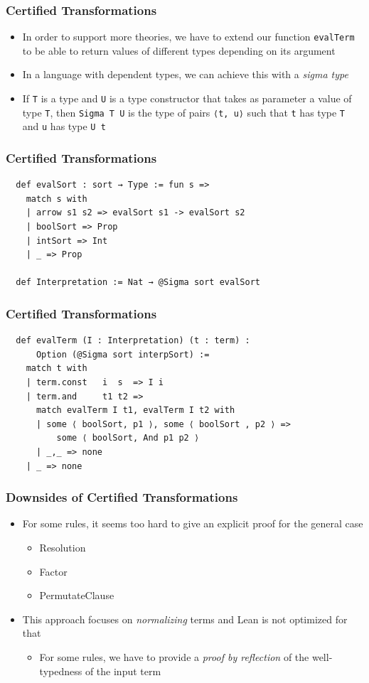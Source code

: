 \documentclass[usepdftitle=false,aspectratio=169,usenames,dvipsnames]{beamer}
\newcommand\vitem{\vfill\item}
\begin{document}
\begin{frame}
  \frametitle{Certified Transformations}
  \begin{itemize}
    \item In order to support more theories, we have to extend our function \texttt{evalTerm} to be able to return values of different types depending on its argument
    \vitem In a language with dependent types, we can achieve this with a \textit{sigma type}
    \vitem If \texttt{T} is a type and \texttt{U} is a type constructor that takes as parameter a value of type \texttt{T}, then \texttt{Sigma T U} is the type of pairs \texttt{⟨t, u⟩} such that \texttt{t} has type \texttt{T} and \texttt{u} has type \texttt{U t}
  \end{itemize}
\end{frame}

\begin{frame}[fragile]
  \frametitle{Certified Transformations}
  \begin{verbatim}
  def evalSort : sort → Type := fun s =>
    match s with
    | arrow s1 s2 => evalSort s1 -> evalSort s2
    | boolSort => Prop
    | intSort => Int
    | _ => Prop

  def Interpretation := Nat → @Sigma sort evalSort
  \end{verbatim}
\end{frame}
\begin{frame}[fragile]
  \frametitle{Certified Transformations}
  \begin{verbatim}
  def evalTerm (I : Interpretation) (t : term) :
      Option (@Sigma sort interpSort) :=
    match t with
    | term.const   i  s  => I i
    | term.and     t1 t2 =>
      match evalTerm I t1, evalTerm I t2 with
      | some ⟨ boolSort, p1 ⟩, some ⟨ boolSort , p2 ⟩ =>
          some ⟨ boolSort, And p1 p2 ⟩
      | _,_ => none
    | _ => none
    \end{verbatim}
\end{frame}

\begin{frame}
  \frametitle{Downsides of Certified Transformations}
  \begin{itemize}
    \item For some rules, it seems too hard to give an explicit proof for the general case
    \begin{itemize}
      \item Resolution
      \item Factor
      \item PermutateClause
    \end{itemize}
    \vitem This approach focuses on \textit{normalizing} terms and Lean is not optimized for that
    \begin{itemize}
      \item For some rules, we have to provide a \textit{proof by reflection} of the well-typedness of the input term
    \end{itemize}
  \end{itemize}
\end{frame}
\end{document}

